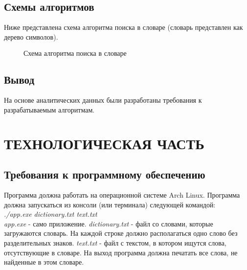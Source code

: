 \documentclass[a4paper,12pt]{article}
\begin{document}
\newpage
\subsection{Схемы алгоритмов}
Ниже представлена схема алгоритма поиска в словаре (словарь представлен как дерево символов).
\begin{figure}[H]
\caption{Схема алгоритма поиска в словаре}
\label{images:scheme1}
\end{figure}

\newpage
\subsection{Вывод}
На основе аналитических данных были разработаны требования к разрабатываемым алгоритмам.


\newpage
\section{ТЕХНОЛОГИЧЕСКАЯ ЧАСТЬ}
\subsection{Требования к программному обеспечению}
Программа должна работать на операционной системе Arch Linux. 
Программа должна запускаться из консоли (или терминала) следующей командой:\\
\textit{./app.exe dictionary.txt text.txt} \\
\textit{app.exe} - само приложение. \textit{dictionary.txt} - файл со словами, которые загружаются словарь. На каждой строке должно располагаться одно слово без разделительных знаков. \textit{text.txt} - файл с текстом, в котором ищутся слова, отсутствующие в словаре.
На выход программа должна печатать все слова, не найденные в этом словаре.
\end{document}
